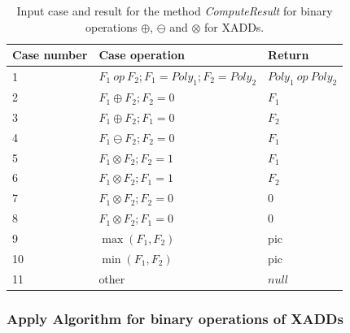 \documentclass[twoside,11pt]{article}
\begin{document}
\begin{table}[!h]
\begin{center}
    \begin{tabular}{|l|l|l|}
	 \hline
	 Case number&Case operation & Return \\ \hline \hline
1&         $F_1\ \mathit{op}\ F_2; F_1=\mathit{Poly}_1; F_2=\mathit{Poly}_2$ & $\mathit{Poly}_1\ \mathit{op}\ \mathit{Poly}_2$ \\
	 \hline
2&          $F_1  \oplus F_2; F_2=0$ & $F_1$\\
	 \hline
3&          $F_1  \oplus F_2; F_1=0$ & $F_2$\\
	 \hline
4&         $F_1  \ominus F_2; F_2=0$ & $F_1$\\
	 \hline
5&         $F_1  \otimes F_2; F_2=1$ & $F_1$\\
	 \hline
6&          $F_1  \otimes F_2; F_1=1$ & $F_2$\\
	 \hline
7&         $F_1  \otimes F_2; F_2=0$ & 0\\
	 \hline
8&          $F_1  \otimes F_2; F_1=0$ &0\\
	 \hline
9&          $\max (F_1  , F_2)$ &pic\\
	 \hline
10&          $\min (F_1, F_2)$ &pic\\
	 \hline
11&	  other& $\mathit{null}$\\
         \hline
    \end{tabular}
  \caption{Input case and result for the method \emph{ComputeResult}
  for binary operations  $\oplus$,  $\ominus$ and $\otimes$ for XADDs.}
  \label{tab:ComputeResultXADD}
\end{center}
\vspace{-10mm}
\end{table}
\subsubsection{Apply Algorithm for binary operations of XADDs}
\end{document}
